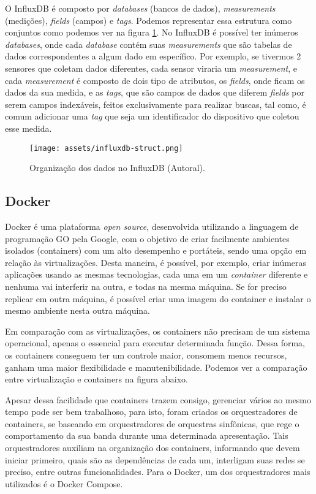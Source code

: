 O InfluxDB é composto por \textit{databases} (bancos de dados), \textit{measurements} (medições), \textit{fields} (campos) e \textit{tags}. Podemos representar essa estrutura como conjuntos como podemos ver na figura \ref{fig:influxdb-struct}. No InfluxDB é possível ter inúmeros \textit{databases}, onde cada \textit{database} contém suas \textit{measurements} que são tabelas de dados correspondentes a algum dado em específico. Por exemplo, se tivermos 2 sensores que coletam dados diferentes, cada sensor viraria um \textit{measurement}, e cada \textit{measurement} é composto  de dois tipo de atributos, os \textit{fields}, onde ficam os dados da sua medida, e as \textit{tags}, que são campos de dados que diferem \textit{fields} por serem campos indexáveis, feitos exclusivamente para realizar buscas, tal como, é comum adicionar uma \textit{tag} que seja um identificador do dispositivo que coletou esse medida.

\begin{figure}[H]
  \centering
  \texttt{[image: assets/influxdb-struct.png]} 
  \caption{Organização dos dados no InfluxDB (Autoral).}
  \label{fig:influxdb-struct} 
\end{figure}

\subsection{Docker}
\label{fund:docker}
Docker é uma plataforma \textit{open source}, desenvolvida utilizando a linguagem de programação GO pela Google, com o objetivo de criar facilmente  ambientes isolados (containers) com um alto desempenho e portáteis, sendo uma opção em relação às virtualizações. Desta maneira, é possível, por exemplo, criar inúmeras aplicações usando as mesmas tecnologias, cada uma em um \textit{container} diferente e nenhuma vai interferir na outra, e todas na mesma máquina. Se for preciso replicar em outra máquina, é possível criar uma imagem do container e instalar o mesmo ambiente nesta outra máquina.

Em comparação com as virtualizações, os containers não precisam de um sistema operacional, apenas o essencial para executar determinada função. Dessa forma, os containers conseguem ter um controle maior, consomem menos recursos, ganham uma maior flexibilidade e manutenibilidade. Podemos ver a comparação entre virtualização e containers na figura abaixo.

Apesar dessa facilidade que containers trazem consigo, gerenciar vários ao mesmo tempo pode ser bem trabalhoso, para isto, foram criados os orquestradores de containers, se baseando em orquestradores de orquestras sinfônicas, que rege o comportamento da sua banda durante uma determinada apresentação. Tais orquestradores auxiliam na organização dos containers, informando que devem iniciar primeiro, quais são as dependências de cada um, interligam suas redes se preciso, entre outras funcionalidades. Para o Docker, um dos orquestradores mais utilizados é o Docker Compose.

